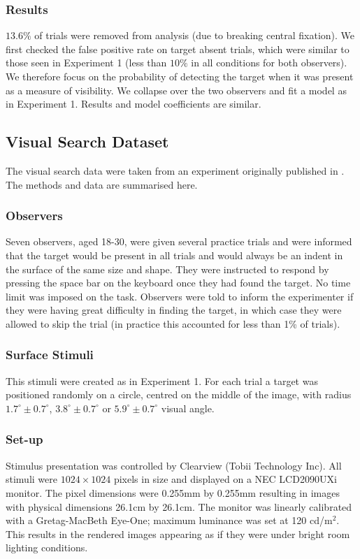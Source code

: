 \documentclass[man]{apa6}
\begin{document}
\subsubsection{Results}

$13.6\%$ of trials were removed from analysis (due to breaking central fixation). 
We first checked the false positive rate on target absent trials, which were similar to those seen in Experiment 1 (less than $10\%$ in all conditions for both observers). We therefore focus on the probability of detecting the target when it was present as a measure of visibility. We collapse over the two observers and fit a model as in Experiment 1. Results and model coefficients are similar. 

\subsection{Visual Search Dataset}

The visual search data were taken from an experiment originally published in \textcite{clarke2009}. The methods and data are summarised here. 

\subsubsection{Observers}
Seven observers, aged 18-30, were given several practice trials and were informed that the target would be present in all trials and would always be an indent in the surface of the same size and shape. They were instructed to respond by pressing the space bar on the keyboard once they had found the target. No time limit was imposed on the task. Observers were told to inform the experimenter if they were having great difficulty in finding the target, in which case they were allowed to skip the trial (in practice this accounted for less than 1\% of trials). 

\subsubsection{Surface Stimuli}
This stimuli were created as in Experiment 1. For each trial a target was positioned randomly on a circle, centred on the middle of the image, with radius $1.7^{\circ} \pm 0.7^{\circ}$, $3.8^{\circ} \pm 0.7^{\circ}$ or $5.9^{\circ} \pm 0.7^{\circ}$ visual angle. 

\subsubsection{Set-up}
Stimulus presentation was controlled by Clearview (Tobii Technology Inc). All stimuli were $1024 \times 1024$ pixels in size and displayed on a NEC LCD2090UXi monitor. The pixel dimensions were 0.255mm by 0.255mm resulting in images with physical dimensions 26.1cm by 26.1cm. The monitor was linearly calibrated with a Gretag-MacBeth Eye-One; maximum luminance was set at 120 cd/m$^2$. This results in the rendered images appearing as if they were under bright room lighting conditions.
\end{document}
